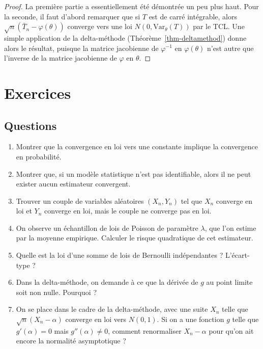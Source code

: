 \documentclass[
  10,
  letterpaper,
  DIV=11,
  numbers=noendperiod]{scrreport}
\providecommand{\tightlist}{%
  \setlength{\itemsep}{0pt}\setlength{\parskip}{0pt}}\usepackage{longtable,booktabs,array}
\theoremstyle{plain}
\theoremstyle{definition}
\theoremstyle{plain}
\theoremstyle{definition}
\theoremstyle{definition}
\theoremstyle{plain}
\theoremstyle{remark}
\begin{document}
\begin{proof}

La première partie a essentiellement été démontrée un peu plus haut.
Pour la seconde, il faut d'abord remarquer que si \(T\) est de carré
intégrable, alors \(\sqrt{n}(\bar{T}_n - \varphi(\theta))\) converge
vers une loi \(N(0, \mathrm{Var}_\theta(T))\) par le TCL. Une simple
application de la delta-méthode (Théorème~\ref{thm-deltamethod}) donne
alors le résultat, puisque la matrice jacobienne de \(\varphi^{-1}\) en
\(\varphi(\theta)\) n'est autre que l'inverse de la matrice jacobienne
de \(\varphi\) en \(\theta\).

\end{proof}


\hypertarget{exercices}{%
\chapter*{Exercices}\label{exercices}}


\hypertarget{questions}{%
\section*{Questions}\label{questions}}


\begin{enumerate}
\def\labelenumi{\arabic{enumi}.}
\tightlist
\item
  Montrer que la convergence en loi vers une constante implique la
  convergence en probabilité.
\item
  Montrer que, si un modèle statistique n'est pas identifiable, alors il
  ne peut exister aucun estimateur convergent.
\item
  Trouver un couple de variables aléatoires \((X_n, Y_n)\) tel que
  \(X_n\) converge en loi et \(Y_n\) converge en loi, mais le couple ne
  converge pas en loi.
\item
  On observe un échantillon de lois de Poisson de paramètre \(\lambda\),
  que l'on estime par la moyenne empirique. Calculer le risque
  quadratique de cet estimateur.
\item
  Quelle est la loi d'une somme de lois de Bernoulli indépendantes ?
  L'écart-type ?
\item
  Dans la delta-méthode, on demande à ce que la dérivée de \(g\) au
  point limite soit non nulle. Pourquoi ?
\item
  On se place dans le cadre de la delta-méthode, avec une suite \(X_n\)
  telle que \(\sqrt{n}(X_n - \alpha)\) converge en loi vers \(N(0,1)\).
  Si on a une fonction \(g\) telle que \(g'(\alpha)=0\) mais
  \(g''(\alpha)\neq 0\), comment renormaliser \(X_n - \alpha\) pour
  qu'on ait encore la normalité asymptotique ?
\end{enumerate}
\end{document}
